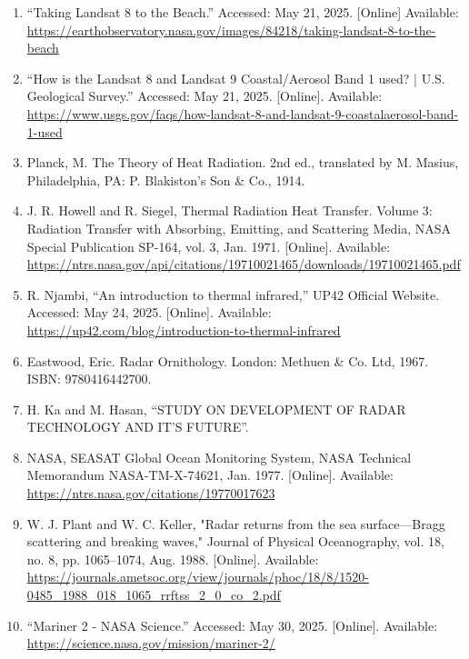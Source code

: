 \documentclass{article}
\begin{document}
\begin{sloppypar}
\begin{enumerate}
    \item{“Taking Landsat 8 to the Beach.” Accessed: May 21, 2025. [Online] Available: \url{https://earthobservatory.nasa.gov/images/84218/taking-landsat-8-to-the-beach}}


    \item{“How is the Landsat 8 and Landsat 9 Coastal/Aerosol Band 1 used? | U.S. Geological Survey.” Accessed: May 21, 2025. [Online]. Available: \url{https://www.usgs.gov/faqs/how-landsat-8-and-landsat-9-coastalaerosol-band-1-used}}

    \item{Planck, M. The Theory of Heat Radiation. 2nd ed., translated by M. Masius, Philadelphia, PA: P. Blakiston's Son & Co., 1914.}

    \item{J. R. Howell and R. Siegel, Thermal Radiation Heat Transfer. Volume 3: Radiation Transfer with Absorbing, Emitting, and Scattering Media, NASA Special Publication SP-164, vol. 3, Jan. 1971. [Online]. Available: \url{https://ntrs.nasa.gov/api/citations/19710021465/downloads/19710021465.pdf}}

    \item {R. Njambi, “An introduction to thermal infrared,” UP42 Official Website. Accessed: May 24, 2025. [Online]. Available: \url{https://up42.com/blog/introduction-to-thermal-infrared}}

    \item{Eastwood, Eric. Radar Ornithology. London: Methuen & Co. Ltd, 1967. ISBN: 9780416442700.}

    \item{H. Ka and M. Hasan, “STUDY ON DEVELOPMENT OF RADAR TECHNOLOGY AND IT’S FUTURE”.}

    \item{NASA, SEASAT Global Ocean Monitoring System, NASA Technical Memorandum NASA-TM-X-74621, Jan. 1977. [Online]. Available: \url{https://ntrs.nasa.gov/citations/19770017623}}


    \item {W. J. Plant and W. C. Keller, "Radar returns from the sea surface—Bragg scattering and breaking waves," Journal of Physical Oceanography, vol. 18, no. 8, pp. 1065–1074, Aug. 1988. [Online]. Available: \url{https://journals.ametsoc.org/view/journals/phoc/18/8/1520-0485_1988_018_1065_rrftss_2_0_co_2.pdf}}

    \item{“Mariner 2 - NASA Science.” Accessed: May 30, 2025. [Online]. Available: \url{https://science.nasa.gov/mission/mariner-2/}}



\end{enumerate}
\end{sloppypar}
\end{document}
